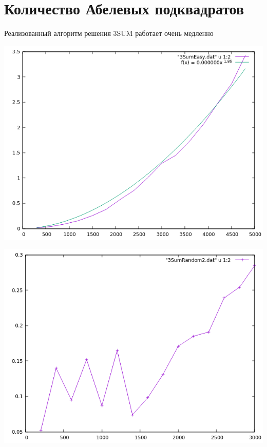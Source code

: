 \section{Количество Абелевых подквадратов}

Реализованный алгоритм решения 3SUM работает очень медленно

\includegraphics[scale=1]{pics/4.png}

\includegraphics[scale=1]{pics/5.png}